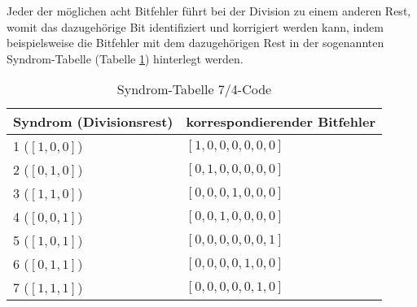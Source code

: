 Jeder der möglichen acht Bitfehler führt bei der Division zu einem anderen Rest,
womit das dazugehörige Bit identifiziert und korrigiert werden kann,
indem beispielsweise die Bitfehler mit dem dazugehörigen Rest in der sogenannten Syndrom-Tabelle (Tabelle \ref{mceliece:tab:syndrome}) hinterlegt werden.
\begin{table}
    \begin{center}
        \begin{tabular}{|l|l|}
            \hline
            Syndrom (Divisionsrest)     &korrespondierender Bitfehler\\
            \hline
            1 ($[1,0,0]$)               &$[1,0,0,0,0,0,0]$\\    
            2 ($[0,1,0]$)               &$[0,1,0,0,0,0,0]$\\    
            3 ($[1,1,0]$)               &$[0,0,0,1,0,0,0]$\\    
            4 ($[0,0,1]$)               &$[0,0,1,0,0,0,0]$\\    
            5 ($[1,0,1]$)               &$[0,0,0,0,0,0,1]$\\    
            6 ($[0,1,1]$)               &$[0,0,0,0,1,0,0]$\\    
            7 ($[1,1,1]$)               &$[0,0,0,0,0,1,0]$\\
            \hline

        \end{tabular}
    \end{center}
    \caption{\label{mceliece:tab:syndrome}Syndrom-Tabelle 7/4-Code}
\end{table}
